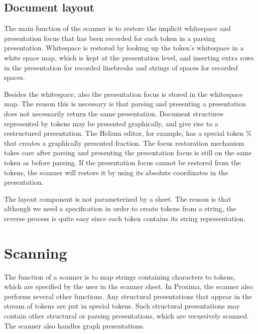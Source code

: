 \documentclass[12pt]{article}
\begin{document}
\subsection{Document layout}

The main function of the scanner is to restore the implicit whitespace and presentation focus that has been recorded for each token in a parsing presentation. Whitespace is restored by looking up the token's whitespace in a white space map, which is kept at the presentation level, and inserting extra rows in the presentation for recorded linebreaks and strings of spaces for recorded spaces. 

Besides the whitespace, also the presentation focus is stored in the whitespace map. The reason this is necessary is that parsing and presenting a presentation does not necessarily return the same presentation. Document structures represented by tokens may be presented graphically, and give rise to a restructured presentation. The Helium editor, for example, has a special token $\%$ that creates a graphically presented fraction. The focus restoration mechanism takes care after parsing and presenting the presentation focus is still on the same token as before parsing. If the presentation focus cannot be restored from the tokens, the scanner will restore it by using its absolute coordinates in the presentation. 

The layout component is not parameterized by a sheet. The reason is that although we need a specification in order to create tokens from a string, the reverse process is quite easy since each token contains its string representation.  





%
\section{Scanning}\label{sect:scanner}
%

The function of a scanner is to map strings containing characters to tokens, which are specified by the user in the scanner sheet. In Proxima, the scanner also performs several other functions. Any structural presentations that appear in the stream of tokens are put in special tokens. Such structural presentations may contain other structural or parsing presentations, which are recursively scanned. The scanner also handles graph presentations. 
\end{document}
